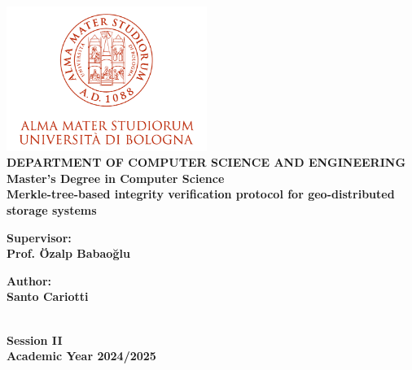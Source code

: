 
\begin{titlepage}
\begin{center}


\includegraphics[width=6.5cm,height=4.7cm]{assets/logo.png}\\[1cm]

{\bfseries DEPARTMENT OF COMPUTER SCIENCE AND ENGINEERING \\ 
Master's Degree in Computer Science } \\[5cm]


{\LARGE \bfseries
Merkle-tree-based integrity verification protocol for geo-distributed storage systems\\[7cm]
}

\begin{minipage}[t]{0.47\textwidth}
\raggedright
{\large \bfseries Supervisor: \\ Prof. Özalp Babaoğlu}
\end{minipage}
\hfill
\begin{minipage}[t]{0.47\textwidth}
\raggedleft
{\large \bfseries Author: \\ Santo Cariotti}
\end{minipage} \\[3cm]

{\large \bfseries Session II\\ 
Academic Year 2024/2025}

\end{center}
\end{titlepage}

\restoregeometry

